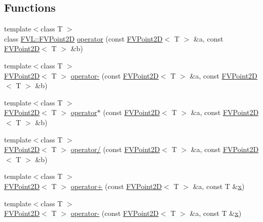 \subsection*{Functions}
\begin{DoxyCompactItemize}
\item 
{\footnotesize template$<$class T $>$ }\\class \hyperlink{classFVL_1_1FVPoint2D}{FVL::FVPoint2D} \hyperlink{namespaceFVL_a9d63c61da787909700ebd6753c6c8b4d}{operator} (const \hyperlink{classFVL_1_1FVPoint2D}{FVPoint2D}$<$ T $>$ \&a, const \hyperlink{classFVL_1_1FVPoint2D}{FVPoint2D}$<$ T $>$ \&b)
\item 
{\footnotesize template$<$class T $>$ }\\\hyperlink{classFVL_1_1FVPoint2D}{FVPoint2D}$<$ T $>$ \hyperlink{namespaceFVL_a7d5cb24f219876bf12dc09b7bf61aced}{operator-\/} (const \hyperlink{classFVL_1_1FVPoint2D}{FVPoint2D}$<$ T $>$ \&a, const \hyperlink{classFVL_1_1FVPoint2D}{FVPoint2D}$<$ T $>$ \&b)
\item 
{\footnotesize template$<$class T $>$ }\\\hyperlink{classFVL_1_1FVPoint2D}{FVPoint2D}$<$ T $>$ \hyperlink{namespaceFVL_adbed70591d9eda691e7b13d65522442a}{operator$\ast$} (const \hyperlink{classFVL_1_1FVPoint2D}{FVPoint2D}$<$ T $>$ \&a, const \hyperlink{classFVL_1_1FVPoint2D}{FVPoint2D}$<$ T $>$ \&b)
\item 
{\footnotesize template$<$class T $>$ }\\\hyperlink{classFVL_1_1FVPoint2D}{FVPoint2D}$<$ T $>$ \hyperlink{namespaceFVL_a2744005a9d13a03dbd598b60efb9e886}{operator/} (const \hyperlink{classFVL_1_1FVPoint2D}{FVPoint2D}$<$ T $>$ \&a, const \hyperlink{classFVL_1_1FVPoint2D}{FVPoint2D}$<$ T $>$ \&b)
\item 
{\footnotesize template$<$class T $>$ }\\\hyperlink{classFVL_1_1FVPoint2D}{FVPoint2D}$<$ T $>$ \hyperlink{namespaceFVL_ac45bd75690254ff12861d49e8f099eef}{operator+} (const \hyperlink{classFVL_1_1FVPoint2D}{FVPoint2D}$<$ T $>$ \&a, const T \&\hyperlink{FVL_2FVPoint2D_8h_a9a4f74af87a76a4c3dcb729cb0e68f8d}{x})
\item 
{\footnotesize template$<$class T $>$ }\\\hyperlink{classFVL_1_1FVPoint2D}{FVPoint2D}$<$ T $>$ \hyperlink{namespaceFVL_a790238a5d379903700a9ca768581f476}{operator-\/} (const \hyperlink{classFVL_1_1FVPoint2D}{FVPoint2D}$<$ T $>$ \&a, const T \&\hyperlink{FVL_2FVPoint2D_8h_a9a4f74af87a76a4c3dcb729cb0e68f8d}{x})
\item 

\end{DoxyCompactItemize}
